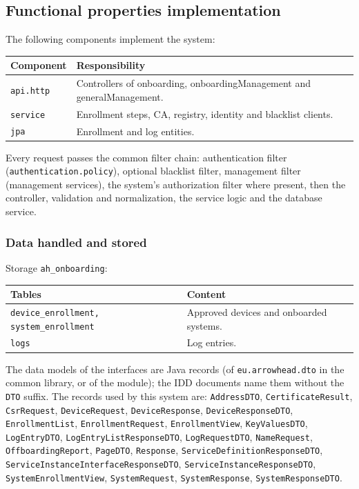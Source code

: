 \documentclass[a4paper]{arrowhead}
\begin{document}
\subsection{Functional properties implementation}

The following components implement the system:

\noindent\begin{longtable}{| p{5.6cm} | p{9.6cm} |} \hline
\rowcolor{gray!33} Component & Responsibility \\ \hline \endhead
\texttt{api.\allowbreak{}http} & Controllers of onboarding, onboarding\allowbreak{}Management and generalManagement. \\ \hline
\texttt{service} & Enrollment steps, CA, registry, identity and blacklist clients. \\ \hline
\texttt{jpa} & Enrollment and log entities. \\ \hline
\end{longtable}

Every request passes the common filter chain: authentication filter (\texttt{authentication.\allowbreak{}policy}), optional blacklist filter, management filter (management services), the system's authorization filter where present, then the controller, validation and normalization, the service logic and the database service.

\subsubsection{Data handled and stored}

Storage \texttt{ah\_\allowbreak{}onboarding}:

\noindent\begin{longtable}{| p{6.4cm} | p{8.8cm} |} \hline
\rowcolor{gray!33} Tables & Content \\ \hline \endhead
\texttt{device\_\allowbreak{}enrollment,\allowbreak{} system\_\allowbreak{}enrollment} & Approved devices and onboarded systems. \\ \hline
\texttt{logs} & Log entries. \\ \hline
\end{longtable}

The data models of the interfaces are Java records (of \texttt{eu.arrowhead.dto} in the common library, or of the module); the IDD documents name them without the \texttt{DTO} suffix. The records used by this system are: \texttt{AddressDTO}, \texttt{CertificateResult}, \texttt{CsrRequest}, \texttt{DeviceRequest}, \texttt{DeviceResponse}, \texttt{DeviceResponseDTO}, \texttt{EnrollmentList}, \texttt{EnrollmentRequest}, \texttt{EnrollmentView}, \texttt{KeyValuesDTO}, \texttt{LogEntryDTO}, \texttt{Log\allowbreak{}Entry\allowbreak{}List\allowbreak{}Response\allowbreak{}DTO}, \texttt{LogRequestDTO}, \texttt{NameRequest}, \texttt{OffboardingReport}, \texttt{PageDTO}, \texttt{Response}, \texttt{Service\allowbreak{}Definition\allowbreak{}Response\allowbreak{}DTO}, \texttt{Service\allowbreak{}Instance\allowbreak{}Interface\allowbreak{}Response\allowbreak{}DTO}, \texttt{Service\allowbreak{}Instance\allowbreak{}Response\allowbreak{}DTO}, \texttt{System\allowbreak{}Enrollment\allowbreak{}View}, \texttt{SystemRequest}, \texttt{SystemResponse}, \texttt{SystemResponseDTO}.
\end{document}
